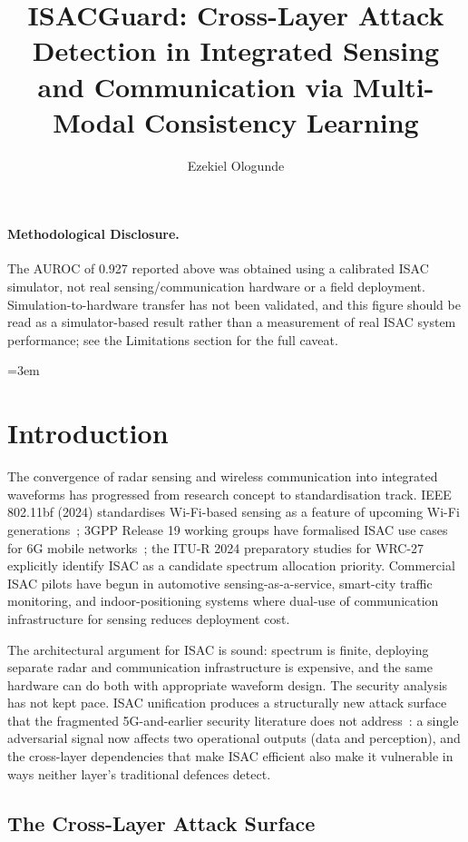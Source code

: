 \documentclass[sigconf,nonacm]{acmart}
\title{ISACGuard: Cross-Layer Attack Detection in Integrated Sensing and Communication via Multi-Modal Consistency Learning}
\author{Ezekiel Ologunde}
\affiliation{%
  \institution{Independent Researcher}
  \city{Boston}
  \state{MA}
  \country{USA}}
\begin{document}
\maketitle

\paragraph{Methodological Disclosure.} The AUROC of 0.927 reported above was obtained using a calibrated ISAC simulator, not real sensing/communication hardware or a field deployment. Simulation-to-hardware transfer has not been validated, and this figure should be read as a simulator-based result rather than a measurement of real ISAC system performance; see the Limitations section for the full caveat.

\sloppy
{}
\emergencystretch=3em
\hfuzz=10pt

\section{Introduction}

The convergence of radar sensing and wireless communication into
integrated waveforms has progressed from research concept to
standardisation track. IEEE 802.11bf (2024) standardises Wi-Fi-based
sensing as a feature of upcoming Wi-Fi
generations~\cite{ieee802bf2024}; 3GPP Release 19 working groups have
formalised ISAC use cases for 6G mobile
networks~\cite{3gpp2024release19,liu2024isac}; the ITU-R 2024
preparatory studies for WRC-27 explicitly identify ISAC as a
candidate spectrum allocation
priority. Commercial ISAC pilots have begun in automotive
sensing-as-a-service, smart-city traffic monitoring, and
indoor-positioning systems where dual-use of communication
infrastructure for sensing reduces deployment cost.

The architectural argument for ISAC is sound: spectrum is finite,
deploying separate radar and communication infrastructure is
expensive, and the same hardware can do both with appropriate
waveform design. The security analysis has not kept pace. ISAC
unification produces a structurally new attack surface that the
fragmented 5G-and-earlier security literature does not
address~\cite{cohen2024sec6g,wang2024isacsec}: a single adversarial
signal now affects two operational outputs (data and perception),
and the cross-layer dependencies that make ISAC efficient also make
it vulnerable in ways neither layer's traditional defences detect.

\subsection{The Cross-Layer Attack Surface}
\end{document}
